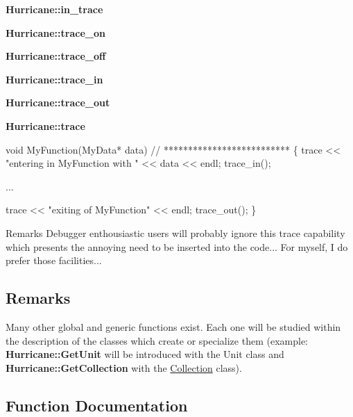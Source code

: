 \begin{DoxyItemize}
\item {\bfseries Hurricane\+::in\+\_\+trace} 
\item {\bfseries Hurricane\+::trace\+\_\+on} 
\item {\bfseries Hurricane\+::trace\+\_\+off} 
\item {\bfseries Hurricane\+::trace\+\_\+in} 
\item {\bfseries Hurricane\+::trace\+\_\+out} 
\item {\bfseries Hurricane\+::trace} 
\end{DoxyItemize}


\begin{DoxyCode}
\textcolor{keywordtype}{void} MyFunction(MyData* data)
\textcolor{comment}{// **************************}
\{
   trace << \textcolor{stringliteral}{"entering in MyFunction with "} << data << endl;
   trace\_in();
 
   ...
 
   trace << \textcolor{stringliteral}{"exiting of MyFunction"} << endl;
   trace\_out();
\}
\end{DoxyCode}
 \begin{DoxyRemark}{Remarks}
Debugger enthousiastic users will probably ignore this trace capability which presents the annoying need to be inserted into the code... For myself, I do prefer those facilities...
\end{DoxyRemark}
\hypertarget{group__Generalities_secGeneralitiesRemarks}{}\subsection{Remarks}\label{group__Generalities_secGeneralitiesRemarks}
Many other global and generic functions exist. Each one will be studied within the description of the classes which create or specialize them (example\+: {\bfseries Hurricane\+::\+Get\+Unit} will be introduced with the Unit class and {\bfseries Hurricane\+::\+Get\+Collection} with the \mbox{\hyperlink{classHurricane_1_1Collection}{Collection}} class). 

\subsection{Function Documentation}
\mbox{\label{group__Generalities_ga93af87d1b7b19294382ba6dae51d0363}} 
